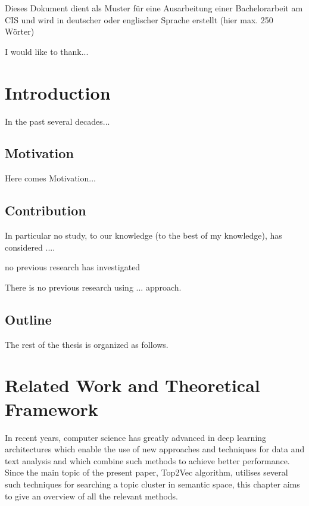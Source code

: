 \documentclass[fontsize=12pt,a4paper,twoside,openany]{scrbook}
\begin{document}
\deckblatt
\pagestyle{scrheadings}

\erklaerung

\thispagestyle{scrplain}
\noindent
Dieses Dokument dient als Muster für eine Ausarbeitung einer
Bachelorarbeit am CIS und wird in deutscher oder englischer Sprache
erstellt (hier max. 250 Wörter)

\thispagestyle{scrplain}
I would like to thank...

\tableofcontents

\chapter{Introduction}
In the past several decades...


\section{Motivation}
Here comes Motivation...

\section{Contribution}

In particular no study, to our knowledge (to the best of my knowledge), has considered ....


no previous research has investigated

There is no previous research using ... approach.

\section{Outline}
The rest of the thesis is organized as follows.


\chapter{Related Work and Theoretical Framework}
\label{chapter:theory}
In recent years, computer science has greatly advanced in deep learning architectures which enable the use of new approaches and techniques for data and text analysis \parencite{Minaee20} and which combine such methods to achieve better performance. Since the main topic of the present paper, Top2Vec algorithm, utilises several such techniques for searching a topic cluster in semantic space, this chapter aims to give an overview of all the relevant methods. 
\end{document}
